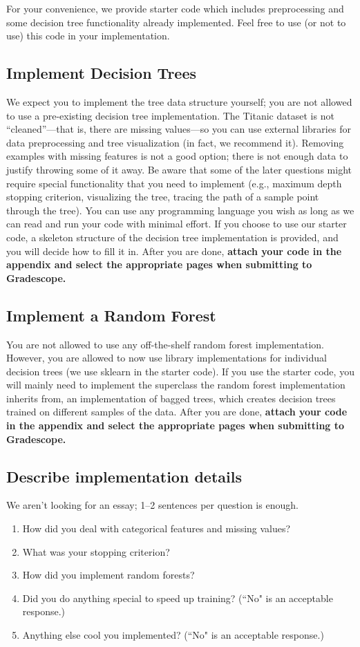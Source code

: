 \documentclass{article}
\begin{document}
For your convenience, we provide starter code which includes preprocessing and some decision tree functionality already implemented. 
Feel free to use (or not to use) this code in your implementation. 

\subsection{Implement Decision Trees}
We expect you to implement the tree data structure yourself; you are not allowed to use a pre-existing decision tree implementation. 
The Titanic dataset is not ``cleaned''---that is, there are missing values---so you can use external libraries for data preprocessing and tree visualization (in fact, we recommend it). 
Removing examples with missing features is not a good option; there is not enough data to justify throwing some of it away. 
Be aware that some of the later questions might require special functionality that you need to implement (e.g., maximum depth stopping criterion, visualizing the tree, tracing the path of a sample point through the tree). 
You can use any programming language you wish as long as we can read and run your code with minimal effort. 
If you choose to use our starter code, a skeleton structure of the decision tree implementation is provided, and you will decide how to fill it in. 
After you are done, \textbf{attach your code in the appendix and select the appropriate pages when submitting to Gradescope.}

\newpage
\subsection{Implement a Random Forest}
You are not allowed to use any off-the-shelf random forest implementation. 
However, you are allowed to now use library implementations for individual decision trees (we use sklearn in the starter code). 
If you use the starter code, you will mainly need to implement the superclass the random forest implementation inherits from, an implementation of bagged trees, which creates decision trees trained on different samples of the data. 
After you are done, \textbf{attach your code in the appendix and select the appropriate pages when submitting to Gradescope.}

\newpage
\subsection{Describe implementation details}
We aren't looking for an essay; 1--2 sentences per question is enough.
\begin{enumerate}
	\item How did you deal with categorical features and missing values?
	\item What was your stopping criterion?
	\item How did you implement random forests?
	\item Did you do anything special to speed up training? (``No" is an acceptable response.)
	\item Anything else cool you implemented? (``No" is an acceptable response.)
\end{enumerate}
\end{document}
